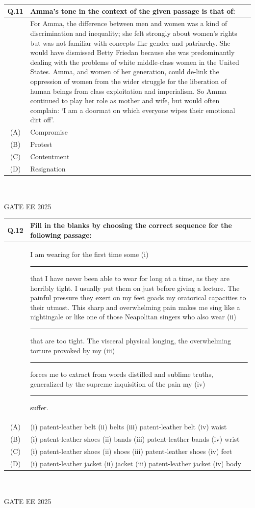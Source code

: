 \documentclass[journal,12pt,onecolumn]{IEEEtran}
\theoremstyle{remark}
\begin{document}
\begin{tabular}{|c|p{16cm}|}\hline
   Q.11 & Amma’s tone in the context of the given passage is that of:\\ \hline
 & For Amma, the difference between men and women was a kind of discrimination and inequality; she felt strongly about women’s rights but was not familiar with concepts like gender and patriarchy. She would have dismissed Betty Friedan because she was predominantly dealing with the problems of white middle-class women in the United States. Amma, and women of her generation, could de-link the oppression of women from the wider struggle for the liberation of human beings from class exploitation and imperialism. So Amma continued to play her role as mother and wife, but would often complain: ‘I am a doormat on which everyone wipes their emotional dirt off’.
\\   \hline
  (A) & Compromise\\     \hline
  (B) & Protest\\  \hline
  (C) & Contentment\\  \hline
  (D) & Resignation\\  \hline
\end{tabular} ~\\ \\
GATE EE 2025\\

\begin{tabular}{|c|p{16cm}|}\hline
   Q.12 & Fill in the blanks by choosing the correct sequence for the following passage: \\ \hline 
 & I am wearing for the first time some (i)\rule{2cm}{0.4pt} that I have never been able to wear for long at a time, as they are horribly tight. I usually put them on just before giving a lecture. The painful pressure they exert on my feet goads my oratorical capacities to their utmost. This sharp and overwhelming pain makes me sing like a nightingale or like one of those Neapolitan singers who also wear (ii)\rule{2cm}{0.4pt} that are too tight. The visceral physical longing, the overwhelming torture provoked by my (iii)\rule{2cm}{0.4pt}  forces me to extract from words distilled and sublime truths, generalized by the supreme inquisition of the pain my (iv)\rule{2cm}{0.4pt} suffer.
  \\   \hline
    (A) & (i) patent-leather belt (ii) belts (iii) patent-leather belt (iv) waist \\
\hline
(B) & (i) patent-leather shoes (ii) bands (iii) patent-leather bands (iv) wrist \\
\hline
(C) & (i) patent-leather shoes (ii) shoes (iii) patent-leather shoes (iv) feet \\
\hline
(D) & (i) patent-leather jacket (ii) jacket (iii) patent-leather jacket (iv) body \\
\hline
\end{tabular} ~\\ \\
GATE EE 2025\\
\end{document}
